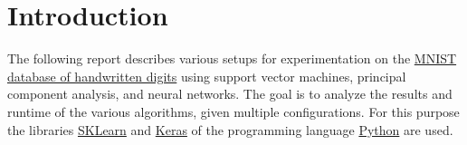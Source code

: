 \chapter{Introduction}
The following report describes various setups for experimentation on the \href{http://yann.lecun.com/exdb/mnist/}{MNIST database of handwritten digits} using 
support vector machines, principal component analysis, and neural networks.
The goal is to analyze the results and runtime of the various algorithms, given multiple configurations.
For this purpose the libraries \href{https://scikit-learn.org/stable/}{SKLearn} and \href{https://keras.io/}{Keras} of the programming language \href{https://www.python.org/}{Python} are used.
